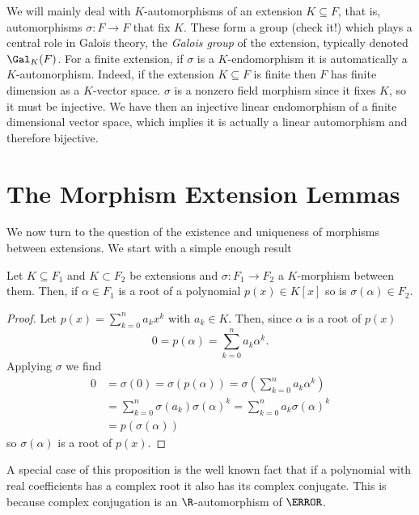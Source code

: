 \documentclass[12pt,oneside]{book}
\begin{document}
\parbreak

We will mainly deal with \( K \)-automorphisms of an extension \( K \subseteq F \), that
is, automorphisms \( \sigma \colon F \to F \) that fix \( K \). These form a group (check
it!) which plays a central role in Galois theory, the \emph{Galois group} of the
extension, typically denoted \( \Gal_K(F) \). For a finite extension, if \( \sigma \)
is a \( K \)-endomorphism it is automatically a \( K \)-automorphism. Indeed, if the
extension \( K \subseteq F \) is finite then \( F \) has finite dimension as a \( K
\)-vector space. \( \sigma \) is a nonzero field morphism since it fixes \( K \), so it
must be injective. We have then an injective linear endomorphism of a finite dimensional
vector space, which implies it is actually a linear automorphism and therefore bijective.

\section{The Morphism Extension Lemmas}
We now turn to the question of the existence and uniqueness of morphisms between
extensions. We start with a simple enough result
\begin{proposition}\label{prop:K-morphisms send roots to roots}
	Let \( K \subseteq F_1 \) and \( K \subset F_2 \) be extensions and \( \sigma \colon
	F_1 \to F_2 \) a \( K	\)-morphism between them. Then, if \( \alpha \in F_1 \) is a
	root of a polynomial \( p(x) \in K[x]	\) so is \( \sigma(\alpha) \in F_2 \). 
\end{proposition}
\begin{proof}
	Let \( p(x) = \sum_{k = 0}^{n} a_k x^k  \) with \( a_k \in K \). Then, since \( \alpha
	\) is a root of \( p(x) \)
	\begin{equation*}
		0 = p(\alpha) = \sum_{k = 0}^{n} a_k \alpha^k.
	\end{equation*}
	Applying \( \sigma \) we find
	\begin{align*}
		0 & = \sigma(0) = \sigma(p(\alpha)) = \sigma\left(\sum_{k = 0}^{n} a_k \alpha^k\right)
		\\
			& = \sum_{k = 0}^{n} \sigma(a_k) \sigma(\alpha)^k
			= \sum_{k = 0}^{n} a_k \sigma(\alpha)^k \tag*{since \( \sigma \) fixes \( K \)} \\
			& = p(\sigma(\alpha))
	\end{align*}
	so \( \sigma(\alpha) \) is a root of \( p(x) \).	
\end{proof}
A special case of this proposition is the well known fact that if a polynomial with real
coefficients has a complex root it also has its complex conjugate. This is because complex
conjugation is an \( \R \)-automorphism of \( \C \).
\end{document}
